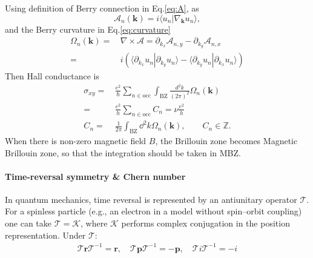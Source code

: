 \documentclass[12pt,a4paper]{article}
\newcommand{\braket}[2]{\langle{#1}|{#2}\rangle}
\begin{document}
    Using definition of Berry connection in Eq.\eqref{eq:A}, as
    \begin{equation}
        \mathcal{A}_n(\mathbf{k})
        = i\langle u_n|\nabla_{\mathbf{k}}u_n\rangle,
    \end{equation}
    and the Berry curvature in Eq.\eqref{eq:curvature}
    \begin{equation}
    \begin{aligned}
        \Omega_n(\mathbf{k})
        = &\, \nabla\times \mathcal{A}
        = \partial_{k_x}\mathcal{A}_{n,y} - \partial_{k_y}\mathcal{A}_{n,x} \\
        = &\, i\left( \braket{\partial_{k_x}u_n}{\partial_{k_y}u_n}
        - \braket{\partial_{k_y}u_n}{\partial_{k_x}u_n} \right)
    \end{aligned}
    \end{equation}
    Then Hall conductance is
    \begin{equation}
    \begin{aligned}
        \sigma_{xy}
        = &\, \frac{e^2}{\hbar} \sum_{n\in\mathrm{occ}} \int_{\mathrm{BZ}}
        \frac{d^2k}{(2\pi)^2} \Omega_n(\mathbf{k}) \\
        = &\, \frac{e^2}{h} \sum_{n\in\mathrm{occ}} C_n
        = \nu \frac{e^2}{h} \\
        C_n
        = &\, \frac{1}{2\pi} \int_{\mathrm{BZ}} \dd^2k \Omega_n(\mathbf{k}),
        \qquad C_n\in\mathbb{Z}.
    \end{aligned}
    \end{equation}
    When there is non-zero magnetic field $B$, the Brillouin zone becomes Magnetic Brillouin zone, so that the integration should be taken in MBZ.

\paragraph{Time-reversal symmetry \& Chern number}

    In quantum mechanics, time reversal is represented by an antiunitary operator \(\mathcal{T}\). For a spinless particle (e.g., an electron in a model without spin–orbit coupling) one can take \(\mathcal{T} = \mathcal{K}\), where \(\mathcal{K}\) performs complex conjugation in the position representation. Under \(\mathcal{T}\):
    \begin{align}
        \mathcal{T} \mathbf{r} \mathcal{T}^{-1} = \mathbf{r}, \quad
        \mathcal{T} \mathbf{p} \mathcal{T}^{-1} = -\mathbf{p}, \quad
        \mathcal{T} i \mathcal{T}^{-1} = -i
    \end{align}
\end{document}
